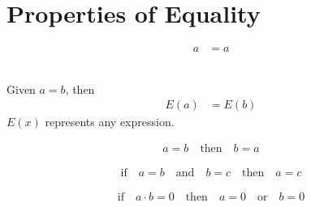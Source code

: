 \documentclass[20150903-160354-rs2.2-MarksMathNotebook.tex]{subfiles}
\begin{document}
\section{Properties of Equality}

\begin{property}
\begin{subequations}
\begin{align}
a &= a \label{eq:rpe}
\end{align}
\end{subequations}
\end{property}

\begin{property} \hfill \\

Given $a=b$, then
\begin{align}
E(a) &= E(b) \label{eq:spe}
\end{align}
$E(x)$ represents any expression.
\end{property}

\begin{property}
\begin{subequations}
\begin{align}
a =b \quad \text{then} \quad b=a \label{eq:sype}
\end{align}
\end{subequations}
\end{property}

\begin{property}
\begin{subequations}
\begin{align}
\text{if} \quad a=b \quad \text{and} \quad b=c \quad \text{then} \quad a =c \label{eq:tpe}
\end{align}
\end{subequations}
\end{property}

\begin{property}
\begin{subequations}
\begin{align}
\text{if} \quad a \cdot b=0 \quad \text{then} \quad a=0 \quad \text{or} \quad b=0 \label{eq:zfp}
\end{align}
\end{subequations}
\end{property}
\end{document}
